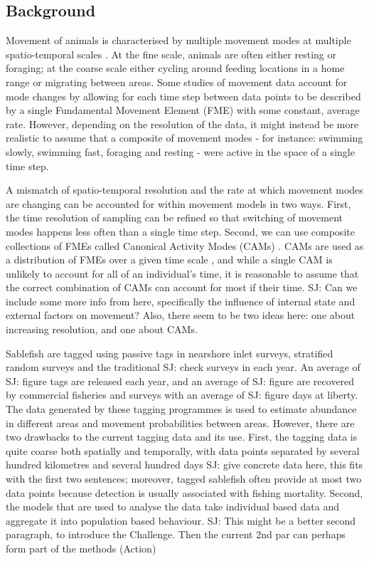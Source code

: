 \documentclass{article}
\newcommand{\sj}[1]{{\color{red}\mbox{}\marginpar{\raggedleft\hspace{0pt}*} SJ: #1}}
\begin{document}
\subsection{Background}

Movement of animals is characterised by multiple movement modes at multiple spatio-temporal scales \citep{nathan2008movement,fryxell2008multiple}. At the fine scale, animals are often either resting or foraging; at the coarse scale either cycling around feeding locations in a home range or migrating between areas. Some studies of movement data account for mode changes by allowing for each time step between data points to be described by a single Fundamental Movement Element (FME) with some constant, average rate. However, depending on the resolution of the data, it might instead be more realistic to assume that a composite of movement modes - for instance: swimming slowly, swimming fast, foraging and resting - were active in the space of a single time step. 

A mismatch of spatio-temporal resolution and the rate at which movement modes are changing can be accounted for within movement models in two ways. First, the time resolution of sampling can be refined so that switching of movement modes happens less often than a single time step. Second, we can use composite collections of FMEs called Canonical Activity Modes (CAMs) \citep{fryxell2008multiple}. CAMs are used as a distribution of FMEs over a given time scale , and while a single CAM is unlikely to account for all of an individual's time, it is reasonable to assume that the correct combination of CAMs can account for most if their time. \sj{Can we include some more info from \citet{nathan2008movement} here, specifically the influence of internal state and external factors on movement? Also, there seem to be two ideas here: one about increasing resolution, and one about CAMs.}

Sablefish are tagged using passive tags in nearshore inlet surveys, stratified random surveys and the traditional \sj{check} surveys in each year. An average of \sj{figure} tags are released each year, and an average of \sj{figure} are recovered by commercial fisheries and surveys with an average of \sj{figure} days at liberty. The data generated by these tagging programmes is used to estimate abundance in different areas and movement probabilities between areas. However, there are two drawbacks to the current tagging data and its use. First, the tagging data is quite coarse both spatially and temporally, with data points separated by several hundred kilometres and several hundred days \sj{give concrete data here, this fits with the first two sentences}; moreover, tagged sablefish often provide at most two data points because detection is usually associated with fishing mortality. Second, the models that are used to analyse the data take individual based data and aggregate it into population based behaviour. \sj{This might be a better second paragraph, to introduce the Challenge. Then the current 2nd par can perhaps form part of the methods (Action)}
\end{document}

